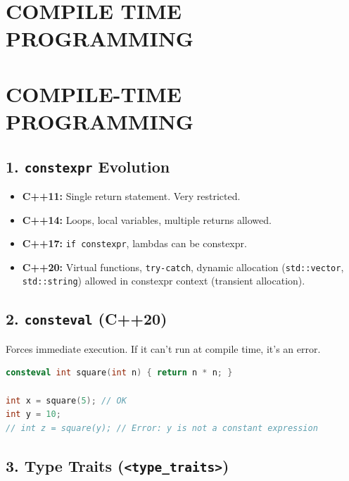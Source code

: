 \hypertarget{compile-time-programming}{%
\chapter{COMPILE TIME PROGRAMMING}\label{compile-time-programming}}

\hypertarget{compile-time-programming-1}{%
\chapter{COMPILE-TIME PROGRAMMING}\label{compile-time-programming-1}}

\hypertarget{constexpr-evolution}{%
\section{\texorpdfstring{1. \texttt{constexpr}
Evolution}{1. constexpr Evolution}}\label{constexpr-evolution}}

\begin{itemize}
\tightlist
\item
  \textbf{C++11:} Single return statement. Very restricted.
\item
  \textbf{C++14:} Loops, local variables, multiple returns allowed.
\item
  \textbf{C++17:} \passthrough{\lstinline!if constexpr!}, lambdas can be
  constexpr.
\item
  \textbf{C++20:} Virtual functions,
  \passthrough{\lstinline!try-catch!}, dynamic allocation
  (\passthrough{\lstinline!std::vector!},
  \passthrough{\lstinline!std::string!}) allowed in constexpr context
  (transient allocation).
\end{itemize}

\hypertarget{consteval-c20}{%
\section{\texorpdfstring{2. \texttt{consteval}
(C++20)}{2. consteval (C++20)}}\label{consteval-c20}}

Forces immediate execution. If it can't run at compile time, it's an
error.

\begin{lstlisting}[language={C++}]
consteval int square(int n) { return n * n; }

int x = square(5); // OK
int y = 10;
// int z = square(y); // Error: y is not a constant expression
\end{lstlisting}

\hypertarget{type-traits-type_traits}{%
\section{\texorpdfstring{3. Type Traits
(\texttt{\textless{}type\_traits\textgreater{}})}{3. Type Traits (\textless type\_traits\textgreater)}}\label{type-traits-type_traits}}

